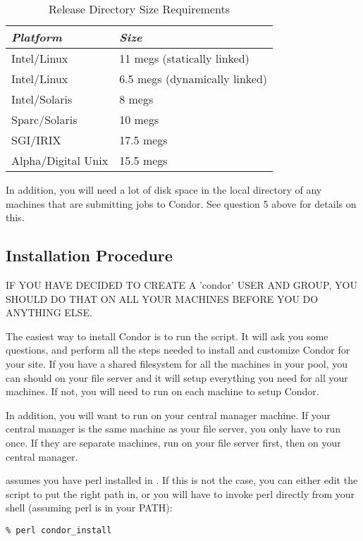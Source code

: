\begin{center}
\begin{table}
\begin{tabular}{|ll|} \hline
\emph{Platform} 	&	\emph{Size}		\\	\hline \hline
	  Intel/Linux   &	11   megs (statically linked) \\
	  Intel/Linux   &	6.5 megs (dynamically linked) \\
	  Intel/Solaris &	8   megs \\
	  Sparc/Solaris &	10   megs \\
	  SGI/IRIX	    &	17.5 megs \\
	  Alpha/Digital Unix & 	15.5 megs \\ \hline
\end{tabular}
\caption{\label{install-sizes}Release Directory Size Requirements}
\end{table}
\end{center}

In addition, you will need a lot of disk space in the local directory
of any machines that are submitting jobs to Condor.  See question 5
above for details on this.


\subsection{Installation Procedure}
\label{install:procedure}

IF YOU HAVE DECIDED TO CREATE A 'condor' USER AND GROUP, YOU SHOULD DO
THAT ON ALL YOUR MACHINES BEFORE YOU DO ANYTHING ELSE.

The easiest way to install Condor is to run the  script.
It will ask you some questions, and perform all the steps needed to
install and customize Condor for your site.  If you have a shared
filesystem for all the machines in your pool, you can should
 on your file server and it will setup everything you
need for all your machines.  If not, you will need to run
 on each machine to setup Condor.

In addition, you will want to run  on your central
manager machine.  If your central manager is the same machine as your
file server, you only have to run  once.  If they are
separate machines, run  on your file server first, then
on your central manager.

 assumes you have perl installed in .  If
this is not the case, you can either edit the script to put the right
path in, or you will have to invoke perl directly from your shell
(assuming perl is in your PATH):
\begin{verbatim}
% perl condor_install
\end{verbatim}

